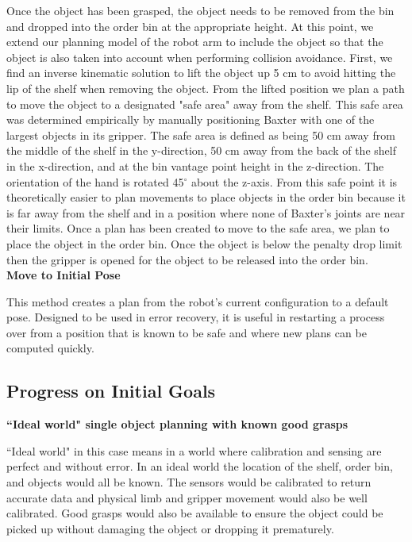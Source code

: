 \documentclass[12pt]{article}
\begin{document}
Once the object has been grasped, the object needs to be removed from the bin and dropped into the order bin at the appropriate height. At this point, we extend our planning model of the robot arm to include the object so that the object is also taken into account when performing collision avoidance. First, we find an inverse kinematic solution to lift the object up 5 cm to avoid hitting the lip of the shelf when removing the object. From the lifted position we plan a path to move the object to a designated "safe area" away from the shelf. This safe area was determined empirically by manually positioning Baxter with one of the largest objects in its gripper. The safe area is defined as being 50 cm away from the middle of the shelf in the y-direction, 50 cm away from the back of the shelf in the x-direction, and at the bin vantage point height in the z-direction. The orientation of the hand is rotated 45$^{\circ}$ about the z-axis. From this safe point it is theoretically easier to plan movements to place objects in the order bin because it is far away from the shelf and in a position where none of Baxter's joints are near their limits. Once a plan has been created to move to the safe area, we plan to place the object in the order bin. Once the object is below the penalty drop limit then the gripper is opened for the object to be released into the order bin.\\

\noindent\textbf{Move to Initial Pose}

This method creates a plan from the robot's current configuration to a default pose. Designed to be used in error recovery, it is useful in restarting a process over from a position that is known to be safe and where new plans can be computed quickly.

\subsection{Progress on Initial Goals}

\noindent\textbf{``Ideal world" single object planning with known good grasps}

``Ideal world" in this case means in a world where calibration and sensing are perfect and without error. In an ideal world the location of the shelf, order bin, and objects would all be known. The sensors would be calibrated to return accurate data and physical limb and gripper movement would also be well calibrated. Good grasps would also be available to ensure the object could be picked up without damaging the object or dropping it prematurely.
\end{document}
